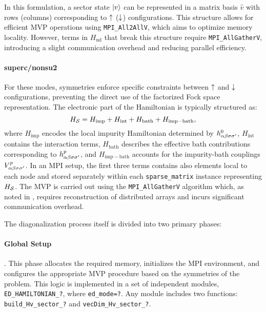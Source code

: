 \documentclass[edipack2.tex]{subfiles}
\begin{document}
In this formulation, a sector state $|v\rangle$ can be
represented in a matrix basis $\hat{v}$ with rows (columns)
corresponding to $\uparrow$ ($\downarrow$) configurations. This structure allows
for efficient MVP operations using {\tt MPI\_All2AllV}, which aims to
optimize memory locality. However, terms in $H_\mathrm{nd}$ that
break this structure require {\tt MPI\_AllGatherV}, introducing a
slight communication overhead and reducing parallel efficiency.





\paragraph{\bf superc/nonsu2}
For these modes, symmetries enforce specific constraints between
$\uparrow$ and $\downarrow$ configurations, preventing the direct use of the
factorized Fock space representation. The electronic
part of the Hamiltonian is typically structured as:
\begin{equation}
H_{\cal S} = H_\mathrm{imp} + H_\mathrm{int} + H_\mathrm{bath} + H_\mathrm{imp-bath},
\end{equation}
where $H_\mathrm{imp}$ encodes the local impurity Hamiltonian
determined by $h^0_{\alpha\beta\sigma\sigma'}$,
$H_\mathrm{int}$ contains the interaction terms, $H_\mathrm{bath}$
describes the effective bath contributions corresponding to
$h^p_{\alpha\beta\sigma\sigma'}$, and $H_\mathrm{imp-bath}$ accounts for the
impurity-bath couplings $V^p_{\alpha\beta\sigma\sigma'}$.
In an MPI setup, the first three terms contains also elements local to each node and
stored separately within each {\tt sparse\_matrix} instance representing $H_{\cal S}$.
The MVP is carried out using the {\tt MPI\_AllGatherV} algorithm which, as noted in
, requires reconstruction of distributed
arrays and incurs significant communication overhead.




The diagonalization process itself is divided into two primary phases:

\paragraph{\bf Global Setup}. This phase allocates the required memory, initializes
the MPI environment, and configures the appropriate MVP procedure
based on the symmetries of the problem. This logic is implemented in
a set of independent modules, {\tt ED\_HAMILTONIAN\_?}, where
{\tt ed\_mode=?}. Any module includes two functions: {\tt build\_Hv\_sector\_?} and  {\tt vecDim\_Hv\_sector\_?}.
\end{document}
